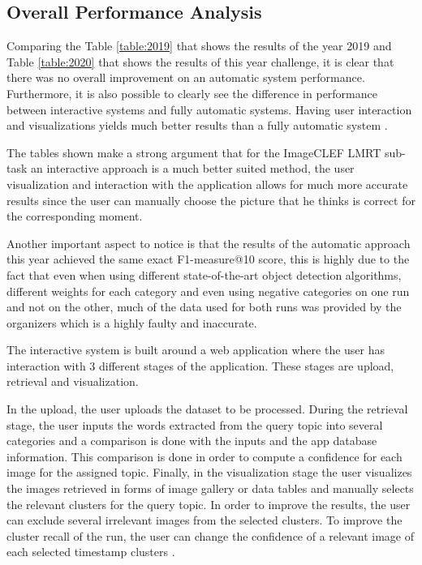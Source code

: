 \subsection{Overall Performance Analysis}
\label{sec:overall_perfomance}

Comparing the Table \ref{table:2019} that shows the results of the year 2019 and Table \ref{table:2020} that shows the results of this year challenge, it is clear that there was no overall improvement on an automatic system performance. Furthermore, it is also possible to clearly see the difference in performance between interactive systems and fully automatic systems. Having user interaction and visualizations yields much better results than a fully automatic system \cite{Ribeiro2020}.


The tables shown make a strong argument that for the ImageCLEF LMRT sub-task an interactive approach is a much better suited method, the user visualization and interaction with the application allows for much more accurate results since the user can manually choose the picture that he thinks is correct for the corresponding moment.

Another important aspect to notice is that the results of the automatic approach this year achieved the same exact F1-measure@10 score, this is highly due to the fact that even when using different state-of-the-art object detection algorithms, different weights for each category and even using negative categories on one run and not on the other, much of the data used for both runs was provided by the organizers which is a highly faulty and inaccurate.



The interactive system is built around a web application where the user has interaction with 3 different stages of the application. These stages are upload, retrieval and visualization. 

In the upload, the user uploads the dataset to be processed. During the retrieval stage, the user inputs the words extracted from the query topic into several categories and a comparison is done with the inputs and the app database information. This comparison is done in order to compute a confidence for each image for the assigned topic. Finally, in the visualization stage the user visualizes the images retrieved in forms of image gallery or data tables and manually selects the relevant clusters for the query topic. In order to improve the results, the user can exclude several irrelevant images from the selected clusters. To improve the cluster recall of the run, the user can change the confidence of a relevant image of each selected timestamp clusters \cite{Ribeiro2020}.

